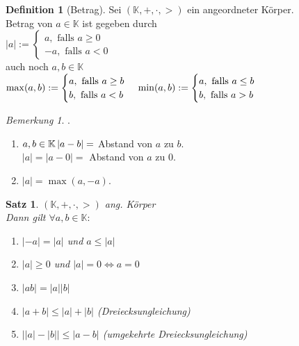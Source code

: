 \documentclass[12pt,a4paper,titlepage]{article} %
\newtheorem{satz}{Satz}[subsection]
\theoremstyle{definition}
\newtheorem{defi}{Definition}[subsection]
\theoremstyle{remark}
\newtheorem*{bem}{Bemerkung}
\begin{document}
\begin{defi}[Betrag]
	Sei $(\mathbb{K}, +,\cdot,>)$ ein angeordneter Körper.\\
	Betrag von $a\in\mathbb{K}$ ist gegeben durch\\
	$\left| a\right| := 
	\begin{cases}
		a, \text{ falls } a\geq 0\\
		-a, \text{ falls }a<0
	\end{cases}$\\
	auch noch $a,b\in \mathbb{K}$\\
	$\max(a,b) := 
	\begin{cases}
		a, \text{ falls } a\geq b\\
		b, \text{ falls } a < b
	\end{cases}\\
	\min(a,b) := 
	\begin{cases}
		a, \text{ falls } a\leq b\\
		b, \text{ falls } a > b
	\end{cases}$\\
\end{defi}
\begin{bem} . %
	\begin{enumerate}
		\item $a,b\in \mathbb{K}\\
		\left| a-b\right| = $ Abstand von $a$ zu $b$.\\
		$\left| a\right| = \left| a-0\right| = $ Abstand von $a$ zu $0$.
		\item $\left| a\right| = \max(a, -a)$.
	\end{enumerate}
\end{bem}
\begin{satz}
	$(\mathbb{K},+,\cdot,>)$ ang. Körper\\
	Dann gilt $\forall a,b\in\mathbb{K}:$
	\begin{enumerate}
		\item $\left|-a\right| = \left| a\right|$ und $a\leq\left|a\right|$
		\item $\left| a\right| \geq 0$ und $\left| a\right| = 0 \Leftrightarrow a = 0$
		\item $\left| ab\right| = \left| a\right| \left| b\right|$
		\item $\left| a+b\right| \leq \left| a\right| + \left|b\right|$ (Dreiecksungleichung)
		\item $\left|\left|a\right|-\left|b\right|\right| \leq \left| a-b\right|$ (umgekehrte Dreiecksungleichung)
	\end{enumerate}
\end{satz}
\end{document}
